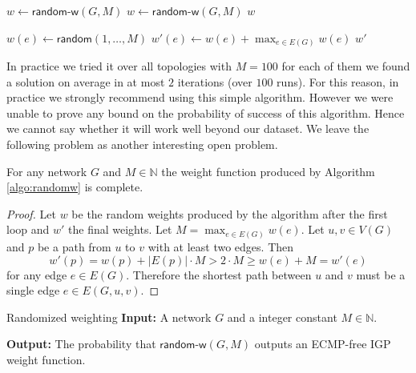 \begin{algorithm}[t]
\small
\caption{$\textsf{randomIGP}\left( G, M \right)$}
\begin{algorithmic}[1]
\STATE $w \gets \textsf{random-w}(G, M)$
  \STATE $w \gets \textsf{random-w}(G, M)$ 
\ENDWHILE
\RETURN $w$
\end{algorithmic}
\label{algo:randomIGP}
\end{algorithm}

\begin{algorithm}[t]
\small
\caption{$\textsf{random-w}\left( G, M \right)$}
\begin{algorithmic}[1]
{}
  \STATE $w(e) \gets \textsf{random}(1, \ldots, M)$
\ENDFOR
{}
  \STATE $w'(e) \gets w(e) + \max_{e \in E(G)} w(e)$
\ENDFOR
\RETURN $w'$
\end{algorithmic}
\label{algo:randomw}
\end{algorithm}

In practice we tried it over all topologies with $M = 100$ for each of them we found a solution on average in at most $2$ iterations (over $100$ runs).
For this reason, in practice we strongly recommend using this simple algorithm. However we were unable to prove any bound on the probability of success
of this algorithm. Hence we cannot say whether it will work well beyond our dataset. We leave the following problem as another interesting open problem.

\begin{lemma}
For any network $G$ and $M \in \mathbb{N}$ the weight function produced by Algorithm \ref{algo:randomw} is complete. 
\end{lemma}

\begin{proof}
Let $w$ be the random weights produced by the algorithm after the first loop and $w'$ the final weights. Let $M = \max_{e \in E(G)} w(e)$. 
Let $u, v \in V(G)$ and $p$ be a path from $u$ to $v$ with at least two edges.
Then
$$
w'(p) = w(p) + |E(p)| \cdot M > 2 \cdot M \geq w(e) + M = w'(e)
$$
for any edge $e \in E(G)$. Therefore the shortest path between $u$ and $v$ must be a single edge $e \in E(G, u, v)$.
\end{proof}

\begin{problem}{Randomized weighting}
\label{prob:randomIGP}
\textbf{Input:} A network $G$ and a integer constant $M \in \mathbb{N}$. 

\textbf{Output:} The probability that $\textsf{random-w}\left( G, M \right)$ outputs an ECMP-free IGP weight function.
\end{problem}


